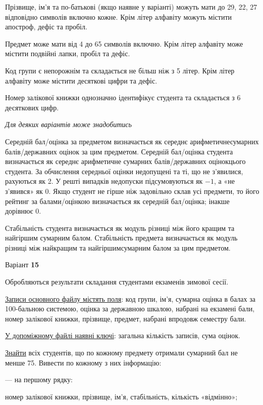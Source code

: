 \documentclass[11pt, ukrainian]{article}
\begin{document}
Прізвище, ім’я та по-батькові (якщо наявне у варіанті) можуть мати до 29, 22, 27 відповідно символів включно кожне. 
Крім літер алфавіту можуть містити апостроф, дефіс та пробіл.

Предмет може мати від 4 до 65 символів включно. 
Крім літер алфавіту може містити подвійні лапки, пробіл та дефіс.

Код групи є непорожнім та складається не більш ніж з 5 літер. 
Крім літер алфавіту може містити десяткові цифри та дефіс.


Номер залікової книжки однозначно ідентифікує студента та складається з 6 десяткових цифр. 

\bigskip\textit{Для деяких варіантів може знадобитись}

Середній бал/оцінка за предметом визначається як середнє арифметичнесумарних балів/державних оцінок за цим предметом. 
Середній бал/оцінка студента визначається як середнє арифметичне сумарних балів/державних оцінокцього студента. 
За обчислення середньої оцінки недопущені та ті, що не з’явилися, рахуються як 2.
У решті випадків недопуски підсумовуються як $-1$, а «не з’явився» як 0.
Якщо студент не гірше ніж задовільно склав усі предмети, 
то його рейтинг за балами/оцінкою визначається як середній бал/оцінка; інакше дорівнює 0.

Стабільність студента визначається як модуль різниці між його кращим та найгіршим сумарним балом.
Стабільність предмета визначається як модуль різниці між найкращим та найгіршимсумарним балом за цим предметом.




\par
\newpage
{\center Варіант  \No \textbf { 15 }\par}
\bigskip
Обробляються результати складання студентами екзаменів зимової сесії.

\underline{Записи основного файлу містять поля}: код групи, ім’я, сумарна оцінка в балах за 100-бальною системою, оцінка за державною шкалою, набрані на екзамені бали, номер залікової книжки, прізвище, предмет, набрані впродовж семестру бали.

\underline{У допоміжному файлі наявні ключі}: загальна кількість записів, сума оцінок.

\underline{Знайти} всіх студентів, що по кожному предмету отримали сумарний бал не менше 75. Вивести по кожному з них інформацію:\par
{\noindent}--- на першому рядку:\par
номер залікової книжки, прізвище, ім’я, стабільність, кількість «відмінно»;
\end{document}
